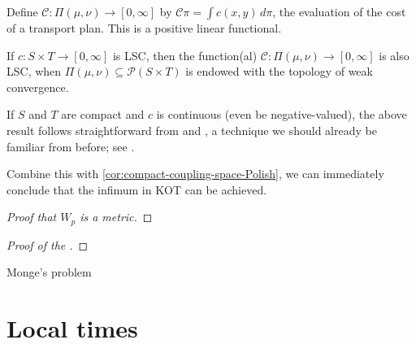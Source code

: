 Define $\mathcal C\colon \Pi(\mu,\nu) \to [0,\infty]$ by $\mathcal C\pi = \int c(x,y)\,d\pi$, the evaluation of the cost of a transport plan. This is a positive linear functional.

\begin{thm}
    If $c\colon S \times T \to [0,\infty]$ is LSC, then the function(al) $\mathcal C\colon \Pi(\mu ,\nu) \to [0,\infty]$ is also LSC, when $\Pi(\mu ,\nu) \subseteq \mathcal P(S \times T)$ is endowed with the topology of weak convergence.
\end{thm}

If $S$ and $T$ are compact and $c$ is continuous (even be negative-valued), the above result follows straightforward from  and , a technique we should already be familiar from before; see \cite[Theorem~1.4]{Santambrogio_2015}.

Combine this with \cref{cor:compact-coupling-space-Polish}, we can immediately conclude that the infimum in KOT can be achieved.

\begin{proof}[Proof that $W_p$ is a metric]
    
\end{proof}

\begin{proof}[Proof of the ]
    
\end{proof}

Monge's problem
    
\section{Local times}